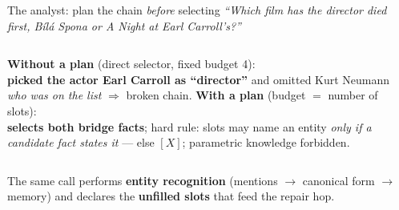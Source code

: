 \documentclass[aspectratio=169,10pt]{beamer}
\newcommand{\good}[1]{\textcolor{verde}{\textbf{#1}}}
\newcommand{\bad}[1]{\textcolor{teja}{\textbf{#1}}}
\begin{document}
\begin{frame}{The analyst: plan the chain \emph{before} selecting}
\footnotesize
\emph{``Which film has the director died first, B\'il\'a Spona or A Night at Earl Carroll's?''}
\centering
{}
\vspace{1.5mm}
\begin{columns}[T]
\textbf{Without a plan} (direct selector, fixed budget 4):\\
\bad{picked the actor Earl Carroll as ``director''} and omitted Kurt
Neumann \emph{who was on the list} $\Rightarrow$ broken chain.
\textbf{With a plan} (budget $=$ number of slots):\\
\good{selects both bridge facts}; hard rule: slots may name an entity
\emph{only if a candidate fact states it} --- else $[X]$; parametric
knowledge forbidden.
\end{columns}
\vspace{1.5mm}
The same call performs \textbf{entity recognition} (mentions $\to$
canonical form $\to$ memory) and declares the \textbf{unfilled slots} that
feed the repair hop.
\end{frame}
\end{document}
